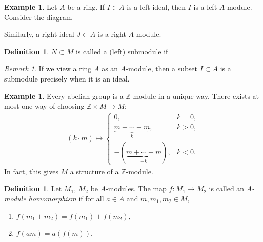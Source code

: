 \documentclass[12pt]{report}
\theoremstyle{plain}
\theoremstyle{remark}
\newtheorem*{remark}{Remark}
\theoremstyle{definition}
\newtheorem{definition}[theorem]{Definition}
\newtheorem{example}[theorem]{Example}
\newcommand{\Z}{\mathbb{Z}}
\begin{document}
\begin{example}
    Let $A$ be a ring. If $I\in A$ is a left ideal, then $I$ is a left $A$-module. Consider the diagram
    \begin{figure}[H]
        \centering
    \end{figure}
    \noindent Similarly, a right ideal $J\subset A$ is a right $A$-module.
\end{example}

\begin{definition}
    $N\subset M$ is called a {(left) submodule} if
    \begin{figure}[H]
        \centering
    \end{figure}
\end{definition}
\begin{remark}
    If we view a ring $A$ as an $A$-module, then a subset $I\subset A$ is a submodule precisely when it is an ideal.
\end{remark}

\begin{example}
    Every abelian group is a $\Z$-module in a unique way. There exists at most one way of choosing $\Z\times M\rightarrow M$:
    \begin{align*}
        (k\cdot m) \mapsto \begin{cases}
            0, & k = 0, \\
            \underbrace{m+\cdots+m}_k, & k>0, \\
            -(\underbrace{m+\cdots+m}_{-k}), & k<0.
        \end{cases}
    \end{align*}
    In fact, this gives $M$ a structure of a $\Z$-module.
\end{example}

\begin{definition}
    Let $M_1$, $M_2$ be $A$-modules. The map $f:M_1\rightarrow M_2$ is called an \emph{$A$-module homomorphism} if for all $a\in A$ and $m,m_1,m_2\in M$,
    \begin{enumerate}
        \item $f(m_1+m_2) = f(m_1) + f(m_2)$,
        \item $f(am)=a(f(m))$.
    \end{enumerate}
\end{definition}
\end{document}
